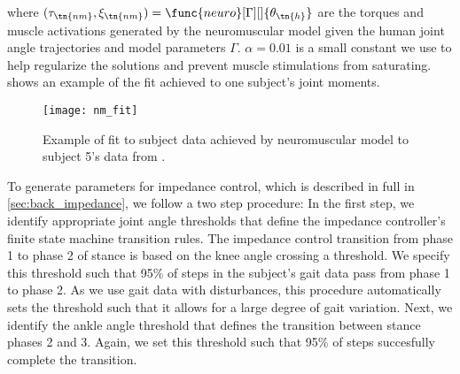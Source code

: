 where $(\tau_\tn{nm}, \xi_\tn{nm}) = \func{neuro}[\Gamma][]{\theta_\tn{h}}$ are
the torques and muscle activations generated by the neuromuscular model given
the human joint angle trajectories and model parameters $\Gamma$. $\alpha =
0.01$ is a small constant we use to help regularize the solutions and prevent
muscle stimulations from saturating.  shows an
example of the fit achieved to one subject's joint moments.
\begin{figure}[t]
    \centering 
    \texttt{[image: nm\_fit]}
    \caption{Example of fit to subject data achieved by neuromuscular model to
    subject 5's data from
    \citet{moore2015elaborate}.}\label{fig:treadmill_nm_fit}
\end{figure}

To generate parameters for impedance control, which is described in full in
\cref{sec:back_impedance}, we follow a two step procedure: In the first step, we
identify appropriate joint angle thresholds that define the impedance
controller's finite state machine transition rules. The impedance control
transition from phase 1 to phase 2 of stance is based on the knee angle crossing
a threshold. We specify this threshold such that 95\% of steps in the subject's
gait data pass from phase 1 to phase 2. As we use gait data with disturbances,
this procedure automatically sets the threshold such that it allows for a large
degree of gait variation. Next, we identify the ankle angle threshold that
defines the transition between stance phases 2 and 3. Again, we set this
threshold such that 95\% of steps succesfully complete the transition.

